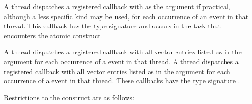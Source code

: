 A thread dispatches a registered  callback 
with  as the  argument if practical, although 
a less specific kind may be used, for each occurrence of an  
event in that thread. This callback has the type signature 
 and occurs in the task that encounters the atomic 
construct.

A thread dispatches a registered  callback 
with all vector entries listed as  in the 
 argument for each occurrence of a  event in 
that thread. A thread dispatches a registered  
callback with all vector entries listed as  
in the  argument for each occurrence of a  event 
in that thread. These callbacks have the type signature 
.

\restrictions
Restrictions to the  construct are as follows:

